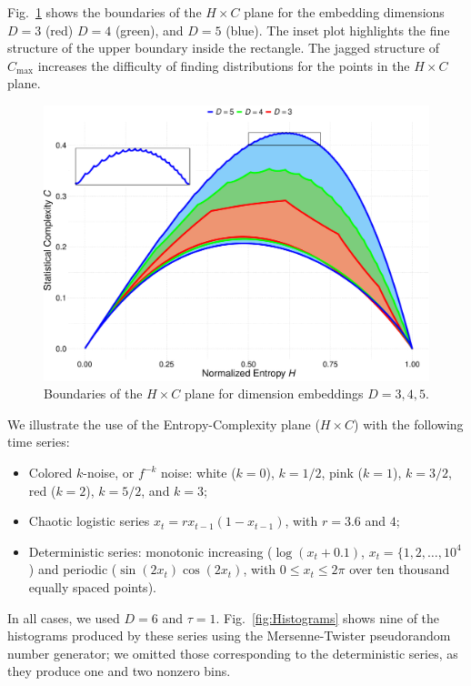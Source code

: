 \documentclass[alpha-refs]{wiley-article}
\begin{document}
Fig.~\ref{fig:Boundaries} shows the boundaries of the $H\times C$ plane for the embedding dimensions $D=3$ (red) $D=4$ (green), and $D=5$ (blue).
The inset plot highlights the fine structure of the upper boundary inside the rectangle.
The jagged structure of $C_{\max}$ increases the difficulty of finding distributions for the points in the $H\times C$ plane.

\begin{figure}[hbt]
	\centering
	\includegraphics[width=.7\linewidth]{Figures/BoundariesPlot}
	\caption{Boundaries of the $H\times C$ plane for dimension embeddings $D=3,4,5$.}\label{fig:Boundaries}
\end{figure}

We illustrate the use of the Entropy-Complexity plane ($H\times C$) with the following time series:
\begin{itemize}
	\item Colored $k$-noise, or $f^{-k}$ noise: white ($k=0$), $k=1/2$, pink ($k=1$), $k=3/2$, red ($k=2$), $k=5/2$, and $k=3$;
	\item Chaotic logistic series $x_t = r x_{t-1} (1 - x_{t-1})$, with $r=3.6$ and $4$;
	\item Deterministic series: monotonic increasing ($\log(x_t+0.1)$, $x_t=\{1,2,\dots,10^4$) and periodic ($\sin(2x_t)\cos(2x_t)$, with $0\leq x_t\leq 2\pi$ over ten thousand equally spaced points).
\end{itemize}
In all cases, we used $D=6$ and $\tau=1$.
Fig.~\ref{fig:Histograms} shows nine of the histograms produced by these series using the Mersenne-Twister pseudorandom number generator;
we omitted those corresponding to the deterministic series, as they produce one and two nonzero bins.
\end{document}

